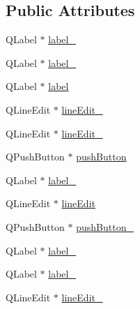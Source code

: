 \subsection*{Public Attributes}
\begin{DoxyCompactItemize}
\item 
Q\-Label $\ast$ \hyperlink{class_ui___u_d_p_game_control_dialog_a1dd4d0a2f76fe448c228237e5db1484f}{label\-\_}
\item 
Q\-Label $\ast$ \hyperlink{class_ui___u_d_p_game_control_dialog_a06bfe88182f5bba6b3df6cd61651d02e}{label\-\_}
\item 
Q\-Label $\ast$ \hyperlink{class_ui___u_d_p_game_control_dialog_a9ebdcf9f23421304b1498e39e581b93b}{label}
\item 
Q\-Line\-Edit $\ast$ \hyperlink{class_ui___u_d_p_game_control_dialog_a9588273b378778aefb012e49ba0e3aeb}{line\-Edit\-\_}
\item 
Q\-Line\-Edit $\ast$ \hyperlink{class_ui___u_d_p_game_control_dialog_ab0bf00d41d5ef1742d806eb15c954a73}{line\-Edit\-\_}
\item 
Q\-Push\-Button $\ast$ \hyperlink{class_ui___u_d_p_game_control_dialog_a2ec4d3ca8339f78ad4d8c60d74d27c74}{push\-Button}
\item 
Q\-Label $\ast$ \hyperlink{class_ui___u_d_p_game_control_dialog_af6b1c6c09d038cef22aac40dcb0e7ee9}{label\-\_}
\item 
Q\-Line\-Edit $\ast$ \hyperlink{class_ui___u_d_p_game_control_dialog_ab34d6c38b6a56f1c86714d965a93d6a0}{line\-Edit}
\item 
Q\-Push\-Button $\ast$ \hyperlink{class_ui___u_d_p_game_control_dialog_a0a06184a877f5fae1cf94c074add1c5b}{push\-Button\-\_}
\item 
Q\-Label $\ast$ \hyperlink{class_ui___u_d_p_game_control_dialog_ab9f08f52a9ea1cc1630f72cdb710b661}{label\-\_}
\item 
Q\-Label $\ast$ \hyperlink{class_ui___u_d_p_game_control_dialog_adc5b4db3fc5094fc1bf7dabb22735adf}{label\-\_}
\item 
Q\-Line\-Edit $\ast$ \hyperlink{class_ui___u_d_p_game_control_dialog_a006400fb1c5e865a0281b2b30f217cbf}{line\-Edit\-\_}
\end{DoxyCompactItemize}


